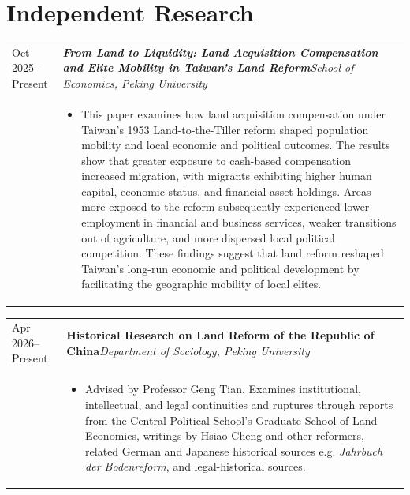 \documentclass[10pt,a4paper]{article}
\makeatletter
\newcommand{\cvdate}[1]{\small\sffamily\color{muted}#1}
\newcommand{\institution}[1]{\small\itshape\color{muted}#1}
\newcommand{\cventry}[4]{%
  \begin{tabularx}{\textwidth}{@{}>{\raggedleft\arraybackslash}p{0.155\textwidth}@{\hspace{0.85em}}X@{}}
    \cvdate{#1} & \textbf{#2}\hfill\institution{#3}\\[-0.22em]
                 & #4
  \end{tabularx}\par\vspace{0.34em}
}
\makeatother
\begin{document}
\section{Independent Research}
\cventry{Oct 2025--Present}{\textit{From Land to Liquidity: Land Acquisition Compensation and Elite Mobility in Taiwan’s Land Reform}}{School of Economics, Peking University}{
  \begin{itemize}
    \item This paper examines how land acquisition compensation under Taiwan’s 1953 Land-to-the-Tiller reform shaped population mobility and local economic and political outcomes. The results show that greater exposure to cash-based compensation increased migration, with migrants exhibiting higher human capital, economic status, and financial asset holdings. Areas more exposed to the reform subsequently experienced lower employment in financial and business services, weaker transitions out of agriculture, and more dispersed local political competition. These findings suggest that land reform reshaped Taiwan’s long-run economic and political development by facilitating the geographic mobility of local elites.
  \end{itemize}
}
\cventry{Apr 2026--Present}{Historical Research on Land Reform of the Republic of China}{Department of Sociology, Peking University}{
  \begin{itemize}
    \item Advised by Professor Geng Tian. Examines institutional, intellectual, and legal continuities and ruptures through reports from the Central Political School's Graduate School of Land Economics, writings by Hsiao Cheng and other reformers, related German and Japanese historical sources e.g. \textit{Jahrbuch der Bodenreform}, and legal-historical sources.
  \end{itemize}
}
\end{document}
